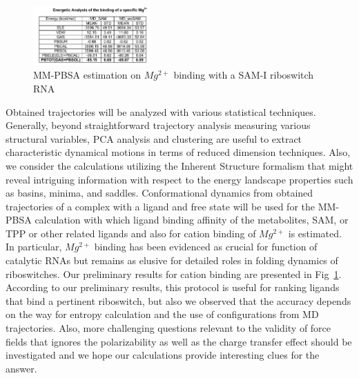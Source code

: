 \documentclass[a4paper,10pt]{article}
\newcommand{\up}{\vspace*{-1em}}
\begin{document}
\begin{figure}
  \includegraphics[width=0.4\textwidth]{mm-pbsa-mg}
   \caption{MM-PBSA estimation on ${Mg^{2+}}$ binding with a SAM-I riboswitch RNA}
\up\up
\label{fig:mm-pbsa-mg-table}
\end{figure}


Obtained trajectories will be analyzed with various statistical techniques.  Generally, beyond straightforward trajectory analysis measuring various structural variables, PCA analysis and clustering are useful to extract characteristic dynamical motions in terms of reduced dimension techniques\cite{kimjpcb2010, SAM-I-NAR2009}.   Also, we consider the calculations utilizing the Inherent Structure formalism that might reveal intriguing information with respect to the energy landscape properties such as basins, minima, and saddles\cite{kimpre2002,kimjcp2004}.  Conformational dynamics from obtained trajectories of a complex with a ligand and free state will be used for the MM-PBSA calculation with which ligand binding affinity of the metabolites, SAM, or TPP or other related ligands and also for cation binding of ${Mg^{2+}}$ is estimated.  In particular, ${Mg^{2+}}$ binding has been evidenced as crucial for function of catalytic RNAs but remains as elusive for detailed roles in folding dynamics of riboswitches.  Our preliminary results for cation binding are presented in Fig~\ref{fig:mm-pbsa-mg-table}.  According to our preliminary results, this protocol is useful for ranking ligands that bind a pertinent riboswitch, but also we observed that the accuracy depends on the way for entropy calculation and the use of configurations from MD trajectories.  Also, more challenging questions relevant to the validity of force fields that ignores the polarizability as well as the charge transfer effect should be investigated and we hope our calculations provide interesting clues for the answer.      
\end{document}
